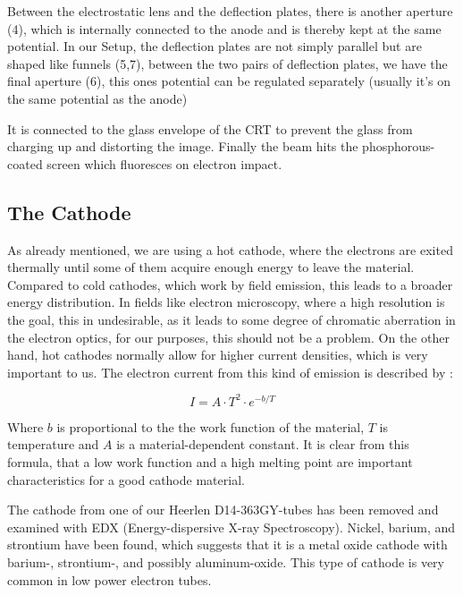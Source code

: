 Between the electrostatic lens and the deflection plates, there is another aperture (4), which is internally connected to the anode and is thereby kept at the same potential. In our Setup, the deflection plates are not simply parallel but are shaped like funnels (5,7), between the two pairs of deflection plates, we have the final aperture (6), this ones potential can be regulated separately (usually it's on the same potential as the anode) 

It is connected to the glass envelope of the CRT to prevent the glass from charging up and distorting the image. 
Finally the beam hits the phosphorous-coated screen which fluoresces on electron impact.

\subsection{The Cathode}

As already mentioned, we are using a hot cathode, where the electrons are exited thermally until some of them acquire enough energy to leave the material. Compared to cold cathodes, which work by field emission, this leads to a broader energy distribution. In fields like electron microscopy, where a high resolution is the goal, this in undesirable, as it leads to some degree of chromatic aberration in the electron optics, for our purposes, this should not be a problem. On the other hand, hot cathodes normally allow for higher current densities, which is very important to us. The  electron current from this kind of emission is described by \cite[chp 3.2.3]{Whitaker}: 

\begin{equation}\label{eq:thermionic_current}
I=A\cdot T^2 \cdot e^{-b/T}
\end{equation}

Where $b$ is proportional to the the work function of the material, $T$ is temperature and $A$ is a material-dependent constant. It is clear from this formula, that a low work function and a high melting point are important characteristics for a good cathode material. 

The cathode from one of our Heerlen D14-363GY-tubes has been removed and examined with EDX (Energy-dispersive X-ray Spectroscopy). Nickel, barium, and strontium have been found, which suggests that it is a metal oxide cathode with barium-, strontium-, and possibly aluminum-oxide. This type of cathode is very common in low power electron tubes.


